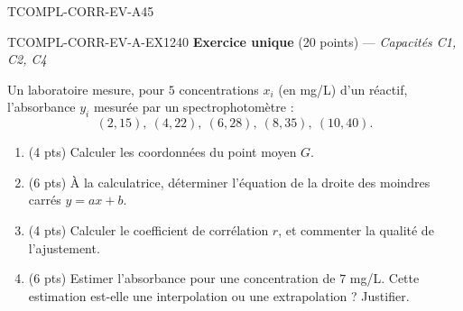

\begin{evaluation}{TCOMPL-CORR-EV-A}{45}

\begin{exercice}{TCOMPL-CORR-EV-A-EX1}{2}{40}
\textbf{Exercice unique} (20 points) --- \textit{Capacités C1, C2, C4}

\medskip

Un laboratoire mesure, pour $5$ concentrations $x_i$ (en mg/L) d'un réactif, l'absorbance $y_i$ mesurée par un spectrophotomètre :
\[
  (2,15),\ (4,22),\ (6,28),\ (8,35),\ (10,40).
\]
\begin{enumerate}
  \item (4 pts) Calculer les coordonnées du point moyen $G$.
  \item (6 pts) À la calculatrice, déterminer l'équation de la droite des moindres carrés $y=ax+b$.
  \item (4 pts) Calculer le coefficient de corrélation $r$, et commenter la qualité de l'ajustement.
  \item (6 pts) Estimer l'absorbance pour une concentration de $7$ mg/L. Cette estimation est-elle une interpolation ou une extrapolation ? Justifier.
\end{enumerate}
\end{exercice}

\end{evaluation}
